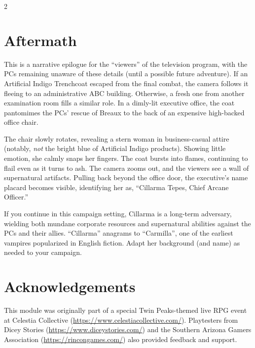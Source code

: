 \documentclass{book}
\newcommand{\ai}{{\color{cyan}Artificial Indigo}\xspace}
\begin{document}
\begin{multicols*}{2}
\section{Aftermath}

    This is a narrative epilogue for the ``viewers'' of the television program, with the PCs remaining unaware of these details (until a possible future adventure).  If an \ai Trenchcoat escaped from the final combat, the camera follows it fleeing to an administrative ABC building.  Otherwise, a fresh one from another examination room fills a similar role.  In a dimly-lit executive office, the coat pantomimes the PCs' rescue of Breaux to the back of an expensive high-backed office chair.

    The chair slowly rotates, revealing a stern woman in business-casual attire (notably, \emph{not} the bright blue of \ai products).  Showing little emotion, she calmly snaps her fingers.  The coat bursts into flames, continuing to flail even as it turns to ash.  The camera zooms out, and the viewers see a wall of supernatural artifacts.  Pulling back beyond the office door, the executive's name placard becomes visible, identifying her as, ``Cillarma Tepes, Chief Arcane Officer.''

If you continue in this campaign setting, Cillarma is a long-term adversary, wielding both mundane corporate resources and supernatural abilities against the PCs and their allies.  ``Cillarma'' anagrams to ``Carmilla'', one of the earliest vampires popularized in English fiction.  Adapt her background (and name) as needed to your campaign.

\section{Acknowledgements}

This module was originally part of a special Twin Peaks-themed live RPG event at Celestia Collective (\url{https://www.celestiacollective.com/}).  Playtesters from Dicey Stories (\url{https://www.diceystories.com/}) and the Southern Arizona Gamers Association (\url{https://rincongames.com/}) also provided feedback and support.

\end{multicols*}
\end{document}
